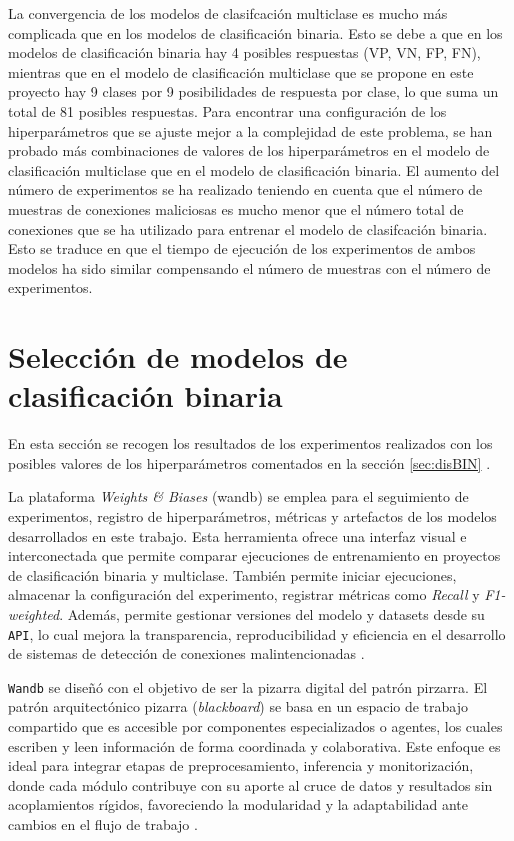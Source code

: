 La convergencia de los modelos de clasifcación multiclase es mucho más complicada que en los modelos de clasificación binaria. Esto se debe a que en los modelos de clasificación binaria hay 4 posibles respuestas (VP, VN, FP, FN), mientras que en el  modelo de clasificación multiclase que se propone en este proyecto hay 9 clases por 9 posibilidades de respuesta por clase, lo que suma un total de 81 posibles respuestas. Para encontrar una configuración de los hiperparámetros que se ajuste mejor a la complejidad de este problema, se han probado más combinaciones de valores de los hiperparámetros en el modelo de clasificación multiclase que en el modelo de clasificación binaria. El aumento del número de experimentos se ha realizado teniendo en cuenta que el número de muestras de conexiones maliciosas es mucho menor que el número total de conexiones que se ha utilizado para entrenar el modelo de clasifcación binaria. Esto se traduce en que el tiempo de ejecución de los experimentos de ambos modelos ha sido similar compensando el número de muestras con el número de experimentos.




\section{Selección de modelos de clasificación binaria}
En esta sección se recogen los resultados de los experimentos realizados con los posibles valores de los hiperparámetros comentados en la sección \ref{sec:disBIN} .

La plataforma \textit{Weights \& Biases} (wandb) se emplea para el seguimiento de experimentos, registro de hiperparámetros, métricas y artefactos de los modelos desarrollados en este trabajo. Esta herramienta ofrece una interfaz visual e interconectada que permite comparar ejecuciones de entrenamiento en proyectos de clasificación binaria y multiclase. También permite iniciar ejecuciones, almacenar la configuración del experimento, registrar métricas como \textit{Recall} y \textit{F1-weighted}. Además, permite gestionar versiones del modelo y datasets desde su \texttt{API}, lo cual mejora la transparencia, reproducibilidad y eficiencia en el desarrollo de sistemas de detección de conexiones malintencionadas \cite{wandb_tracking}.

\texttt{Wandb} se diseñó con el objetivo de ser la pizarra digital del patrón pirzarra. El patrón arquitectónico pizarra (\textit{blackboard}) se basa en un espacio de trabajo compartido que es accesible por componentes especializados o agentes, los cuales escriben y leen información de forma coordinada y colaborativa. Este enfoque es ideal para integrar etapas de preprocesamiento, inferencia y monitorización, donde cada módulo contribuye con su aporte al cruce de datos y resultados sin acoplamientos rígidos, favoreciendo la modularidad y la adaptabilidad ante cambios en el flujo de trabajo \cite{blackboard_architecture}.

